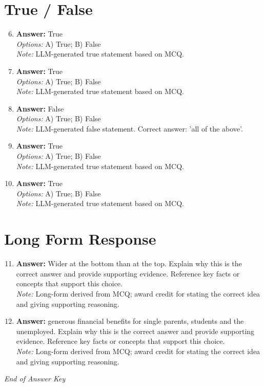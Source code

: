 \documentclass[12pt]{article}
\begin{document}
\section*{True / False}
\begin{enumerate}[label=\arabic*.]
\setcounter{enumi}{5}
\item \textbf{Answer:} True
\\ \textit{Options:} A) True; B) False
\\ \textit{Note:} LLM-generated true statement based on MCQ.
\item \textbf{Answer:} True
\\ \textit{Options:} A) True; B) False
\\ \textit{Note:} LLM-generated true statement based on MCQ.
\item \textbf{Answer:} False
\\ \textit{Options:} A) True; B) False
\\ \textit{Note:} LLM-generated false statement. Correct answer: 'all of the above'.
\item \textbf{Answer:} True
\\ \textit{Options:} A) True; B) False
\\ \textit{Note:} LLM-generated true statement based on MCQ.
\item \textbf{Answer:} True
\\ \textit{Options:} A) True; B) False
\\ \textit{Note:} LLM-generated true statement based on MCQ.
\end{enumerate}

\section*{Long Form Response}
\begin{enumerate}[label=\arabic*.]
\setcounter{enumi}{10}
\item \textbf{Answer:} Wider at the bottom than at the top. Explain why this is the correct answer and provide supporting evidence. Reference key facts or concepts that support this choice.
\\ \textit{Note:} Long-form derived from MCQ; award credit for stating the correct idea and giving supporting reasoning.
\item \textbf{Answer:} generous financial benefits for single parents, students and the unemployed. Explain why this is the correct answer and provide supporting evidence. Reference key facts or concepts that support this choice.
\\ \textit{Note:} Long-form derived from MCQ; award credit for stating the correct idea and giving supporting reasoning.
\end{enumerate}

\vfill
\noindent\textit{End of Answer Key}
\end{document}
